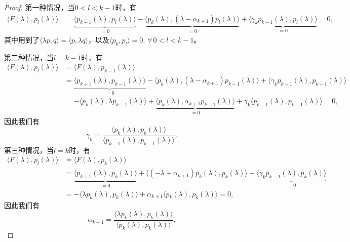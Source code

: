 \begin{subappendices}
\begin{proof}
  第一种情况，当$0 < l < k-1$时，有
  \begin{equation*}
    \begin{split}
      \langle F(\lambda), p_{l}(\lambda) \rangle
      &= \underbrace{\langle p_{k+1}(\lambda),p_{l}(\lambda)\rangle}_{=0}
      - \underbrace{\langle p_{k}(\lambda), \left( \lambda - \alpha_{k+1} \right)p_{l}(\lambda) \rangle}_{=0}
      + \underbrace{\langle \gamma_k p_{k-1}(\lambda), p_{l}(\lambda)\rangle}_{=0} =0,
    \end{split}
  \end{equation*}
  其中用到了$\langle \lambda p, q \rangle = \langle p, \lambda q \rangle$，以及$\langle p_k,p_l \rangle =0, \, \forall \, 0 < l < k-1$。

  第二种情况，当$l = k-1$时，有
  \begin{equation*}
    \begin{split}
      \langle F(\lambda), p_{l}(\lambda) \rangle &= \langle F(\lambda), p_{k-1}(\lambda) \rangle \\
      &= \underbrace{\langle p_{k+1}(\lambda), p_{k-1}(\lambda) \rangle}_{=0} - \langle p_{k}(\lambda), \left( \lambda - \alpha_{k+1} \right) p_{k-1}(\lambda) \rangle
      + \langle \gamma_k p_{k-1}(\lambda), p_{k-1}(\lambda) \rangle \\
      &= -\langle p_{k}(\lambda), \lambda p_{k-1}(\lambda) \rangle
      + \underbrace{\langle p_{k}(\lambda), \alpha_{k+1} p_{k-1}(\lambda) \rangle}_{=0}
      +\gamma_k \langle p_{k-1}(\lambda), p_{k-1}(\lambda) \rangle = 0,
    \end{split}
  \end{equation*}
  因此我们有
  \begin{equation*}
    \gamma_k = \frac{
    \langle p_{k}(\lambda), p_{k}(\lambda) \rangle
    }{
    \langle p_{k-1}(\lambda), p_{k-1}(\lambda) \rangle
    }.
  \end{equation*}
  第三种情况，当$l=k$时，有
  \begin{equation*}
    \begin{split}
      \langle F(\lambda), p_{l}(\lambda) \rangle &= \langle F(\lambda), p_{k}(\lambda) \rangle \\
      &=\underbrace{\langle p_{k+1}(\lambda), p_{k}(\lambda) \rangle}_{=0}
      + \langle \left( -\lambda + \alpha_{k+1} \right) p_{k}(\lambda), p_{k}(\lambda) \rangle
      + \underbrace{\langle \gamma_k p_{k-1}(\lambda), p_{k}(\lambda) \rangle}_{=0} \\
      &=- \langle \lambda p_{k}(\lambda),p_{k}(\lambda) \rangle
      + \alpha_{k+1} \langle p_{k}(\lambda),p_{k}(\lambda) \rangle =0,
    \end{split}
  \end{equation*}
  因此我们有
  \begin{equation*}
    \alpha_{k+1} = \frac{
    \langle \lambda p_{k}(\lambda), p_{k}(\lambda)\rangle
    }{
    \langle p_{k}(\lambda), p_{k}(\lambda) \rangle
    }.
  \end{equation*}
\end{proof}


\end{subappendices}
